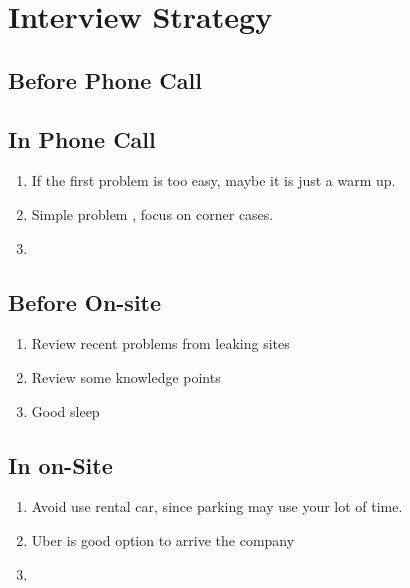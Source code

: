 \chapter{Interview Strategy}

\section{Before Phone Call  }

\section{In Phone Call  }

\begin{enumerate}
    \item If the first problem is too easy, maybe it is just a warm up. 
    \item Simple problem , focus on corner cases. 
    \item  
\end{enumerate}

\section{Before On-site }

\begin{enumerate}
    \item Review recent problems from leaking sites
    \item Review some knowledge points
    \item Good sleep
\end{enumerate}


\section{In on-Site }
\begin{enumerate}
    \item Avoid use rental car, since parking may use your lot of time.
    \item Uber is good option to arrive the company
    \item 
    
\end{enumerate}